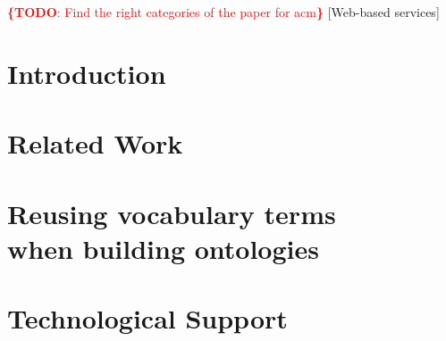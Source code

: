 \documentclass{sig-alternate}
\newcommand{\todo}[1]{\noindent\textcolor{red}{{\bf \{TODO}: #1{\bf \}}}}
\begin{document}
\todo{Find the right categories of the paper for acm}
[Web-based services]






\section{Introduction}\label{sec:introduction}




\section{Related Work}\label{sec:soa}


\section{Reusing vocabulary terms\\ when building ontologies}\label{sec:reuse}

\section{Technological Support}




%
\end{document}
